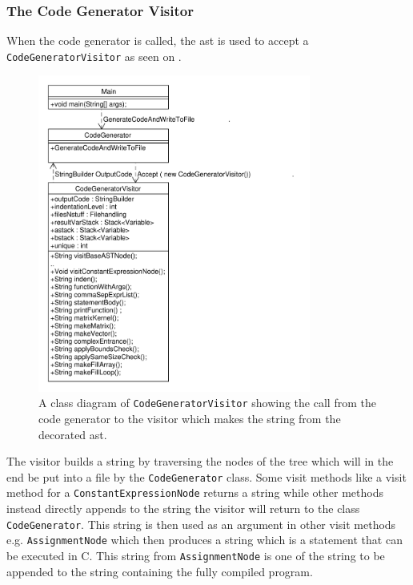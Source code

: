 \subsubsection*{The Code Generator Visitor}
When the code generator is called, the \acrshort{ast} is used to accept a \texttt{CodeGeneratorVisitor} as seen on .

\begin{figure}[!ht]
\centering
 \includegraphics[width=0.8\textwidth]{figures/ClassDiagrams/CodeGeneratorCall.pdf}%
\caption{A class diagram of \texttt{CodeGeneratorVisitor} showing the call from the code generator to the visitor which makes the string from the decorated \acrshort{ast}.}\label{fig:CodeGeneratorVisitor}
\vspace{-15pt}
\end{figure}

The visitor builds a string by traversing the nodes of the tree which will in the end be put into a file by the \texttt{CodeGenerator} class.
Some visit methods like a visit method for a \texttt{ConstantExpressionNode} returns a string while other methods instead directly appends to the string the visitor will return to the class \texttt{CodeGenerator}.
This string is then used as an argument in other visit methods e.g. \texttt{AssignmentNode} which then produces a string which is a statement that can be executed in C.
This string from \texttt{AssignmentNode} is  one of the string to be appended to the string containing the fully compiled program.

